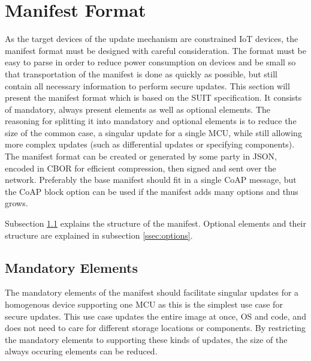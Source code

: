 \documentclass[0-thesis.tex]{subfiles}
\begin{document}

\section{Manifest Format}
\label{sec:manifest-format}
As the target devices of the update mechanism are constrained IoT devices, the manifest
format must be designed with careful consideration. The format must be easy to parse in
order to reduce power consumption on devices and be small so that transportation of the
manifest is done as quickly as possible, but still contain all necessary information to
perform secure updates. This section will present the manifest format which is based on
the SUIT specification. It consists of mandatory, always present elements as well as
optional elements. The reasoning for splitting it into mandatory and optional elements is
to reduce the size of the common case, a singular update for a single MCU, while still
allowing more complex updates (such as differential updates or specifying components). The
manifest format can be created or generated by some party in JSON, encoded in CBOR for
efficient compression, then signed and sent over the network. Preferably the base manifest
should fit in a single CoAP message, but the CoAP block option can be used if the manifest
adds many options and thus grows.

Subsection \ref{ssec:mandatory-elements} explains the structure of the manifest. Optional
elements and their structure are explained in subsection \ref{ssec:options}. 

\subsection{Mandatory Elements}
\label{ssec:mandatory-elements}
The mandatory elements of the manifest should facilitate singular updates for a homogenous
device supporting one MCU as this is the simplest use case for secure updates. This use
case updates the entire image at once, OS and code, and does not need to care for
different storage locations or components. By restricting the mandatory elements to
supporting these kinds of updates, the size of the always occuring elements can be
reduced. 
\end{document}
